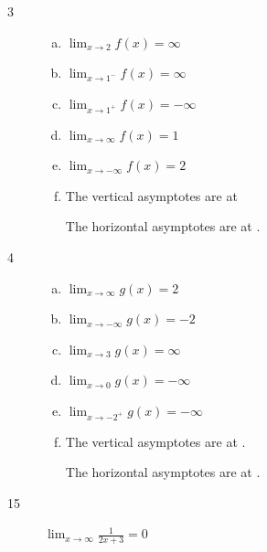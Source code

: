 \documentclass[letterpaper, landscape]{exam}
\begin{document}
    \begin{description}

      \item[3] 
        \begin{enumerate}[(a)]
          \item $\lim_{x \to 2} f(x) = \boxed{ \infty }$

          \item $\lim_{x \to 1^-} f(x) = \boxed{ \infty }$

          \item $\lim_{x \to 1^+} f(x) = \boxed{ -\infty }$

          \item $\lim_{x \to \infty} f(x) = \boxed{ 1 }$

          \item $\lim_{x \to -\infty} f(x) = \boxed{ 2 }$

          \item The vertical asymptotes are at 

            The horizontal asymptotes are at .

        \end{enumerate}

      \item[4] 
        \begin{enumerate}[(a)]
          \item $\lim_{x \to \infty} g(x) = \boxed{ 2 }$

          \item $\lim_{x \to -\infty} g(x) = \boxed{ -2 }$

          \item $\lim_{x \to 3} g(x) = \boxed{ \infty }$

          \item $\lim_{x \to 0} g(x) = \boxed{ -\infty }$

          \item $\lim_{x \to -2^+} g(x) = \boxed{ -\infty }$

          \item The vertical asymptotes are at .

            The horizontal asymptotes are at .

        \end{enumerate}

      \item[15] 
        $\lim_{x \to \infty} \frac{1}{2x + 3} = \boxed{ 0 }$


\end{description}
\end{document}
